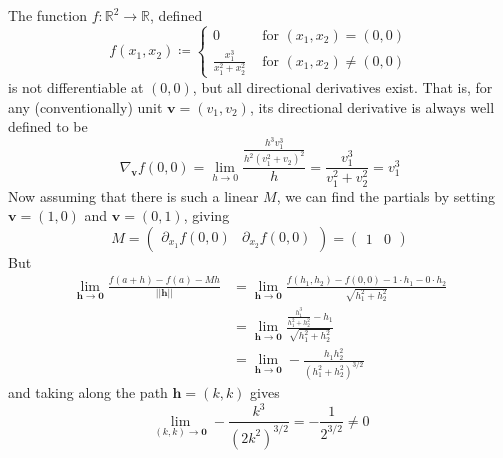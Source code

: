   \begin{example}
    The function $f: \mathbb{R}^2 \longrightarrow \mathbb{R}$, defined 
    \[f(x_1, x_2) \coloneqq \begin{cases} 
    0 & \text{ for } (x_1, x_2) = (0, 0) \\
    \frac{x_1^3}{x_1^2 + x_2^2} & \text{ for } (x_1, x_2) \neq (0, 0)
    \end{cases}\]
    is not differentiable at $(0, 0)$, but all directional derivatives exist. That is, for any (conventionally) unit $\mathbf{v} = (v_1, v_2)$, its directional derivative is always well defined to be 
    \[\nabla_\mathbf{v} f(0, 0) = \lim_{h \rightarrow 0} \frac{\frac{h^3 v_1^3} {h^2 (v_1^2 + v_2)^2}}{h} = \frac{v_1^3}{v_1^2 + v_2^2} = v_1^3\]
    Now assuming that there is such a linear $M$, we can find the partials by setting $\mathbf{v} = (1, 0)$ and $\mathbf{v} = (0, 1)$, giving 
    \[M = \begin{pmatrix} \partial_{x_1} f(0, 0) & \partial_{x_2} f(0, 0) \end{pmatrix} = \begin{pmatrix} 1 & 0 \end{pmatrix}\]
    But 
    \begin{align*}
        \lim_{\mathbf{h} \rightarrow \mathbf{0}} \frac{f(a + h) - f(a) - M h}{||\mathbf{h}||} & = \lim_{\mathbf{h} \rightarrow \mathbf{0}} \frac{f(h_1, h_2) - f(0, 0) - 1 \cdot h_1 - 0 \cdot h_2}{\sqrt{h_1^2 + h_2^2}} \\
        & = \lim_{\mathbf{h} \rightarrow \mathbf{0}} \frac{\frac{h_1^3}{h_1^2 + h_2^2} - h_1}{\sqrt{h_1^2 + h_2^2}} \\
        & = \lim_{\mathbf{h} \rightarrow \mathbf{0}} - \frac{ h_1 h_2^2}{(h_1^2 + h_2^2)^{3/2}}
    \end{align*}
    and taking along the path $\mathbf{h} = (k, k)$ gives 
    \[\lim_{(k, k) \rightarrow \mathbf{0}} - \frac{k^3}{(2k^2)^{3/2}} = - \frac{1}{2^{3/2}} \neq 0\]
  \end{example}

